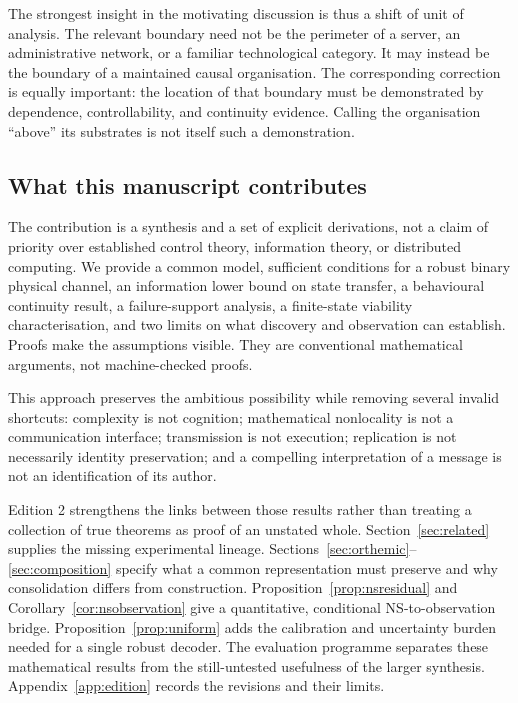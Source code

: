 \documentclass[11pt,a4paper]{article}
\theoremstyle{definition}
\theoremstyle{remark}
\begin{document}
The strongest insight in the motivating discussion is thus a shift of unit of analysis. The relevant boundary need not be the perimeter of a server, an administrative network, or a familiar technological category. It may instead be the boundary of a maintained causal organisation. The corresponding correction is equally important: the location of that boundary must be demonstrated by dependence, controllability, and continuity evidence. Calling the organisation ``above'' its substrates is not itself such a demonstration.

\subsection{What this manuscript contributes}
The contribution is a synthesis and a set of explicit derivations, not a claim of priority over established control theory, information theory, or distributed computing. We provide a common model, sufficient conditions for a robust binary physical channel, an information lower bound on state transfer, a behavioural continuity result, a failure-support analysis, a finite-state viability characterisation, and two limits on what discovery and observation can establish. Proofs make the assumptions visible. They are conventional mathematical arguments, not machine-checked proofs.

This approach preserves the ambitious possibility while removing several invalid shortcuts: complexity is not cognition; mathematical nonlocality is not a communication interface; transmission is not execution; replication is not necessarily identity preservation; and a compelling interpretation of a message is not an identification of its author.

Edition 2 strengthens the links between those results rather than treating a collection of true theorems as proof of an unstated whole. Section~\ref{sec:related} supplies the missing experimental lineage. Sections~\ref{sec:orthemic}--\ref{sec:composition} specify what a common representation must preserve and why consolidation differs from construction. Proposition~\ref{prop:nsresidual} and Corollary~\ref{cor:nsobservation} give a quantitative, conditional NS-to-observation bridge. Proposition~\ref{prop:uniform} adds the calibration and uncertainty burden needed for a single robust decoder. The evaluation programme separates these mathematical results from the still-untested usefulness of the larger synthesis. Appendix~\ref{app:edition} records the revisions and their limits.
\end{document}
